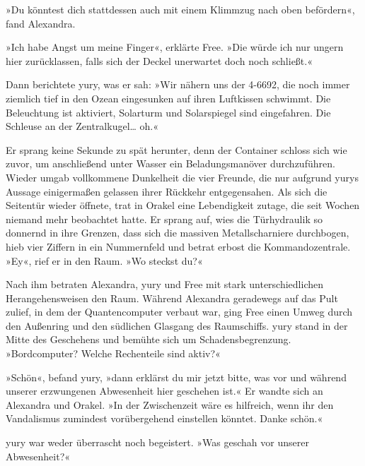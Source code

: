 »Du könntest dich stattdessen auch mit einem Klimmzug nach oben befördern«, fand Alexandra.

»Ich habe Angst um meine Finger«, erklärte Free. »Die würde ich nur ungern hier zurücklassen, falls sich der Deckel unerwartet doch noch schließt.«

Dann berichtete yury, was er sah: »Wir nähern uns der 4-6692, die noch immer ziemlich tief in den Ozean eingesunken auf ihren Luftkissen schwimmt. Die Beleuchtung ist aktiviert, Solarturm und Solarspiegel sind eingefahren. Die Schleuse an der Zentralkugel… oh.«

Er sprang keine Sekunde zu spät herunter, denn der Container schloss sich wie zuvor, um anschließend unter Wasser ein Beladungsmanöver durchzuführen. Wieder umgab vollkommene Dunkelheit die vier Freunde, die nur aufgrund yurys Aussage einigermaßen gelassen ihrer Rückkehr entgegensahen. Als sich die Seitentür wieder öffnete, trat in Orakel eine Lebendigkeit zutage, die seit Wochen niemand mehr beobachtet hatte. Er sprang auf, wies die Türhydraulik so donnernd in ihre Grenzen, dass sich die massiven Metallscharniere durchbogen, hieb vier Ziffern in ein Nummernfeld und betrat erbost die Kommandozentrale. »Ey«, rief er in den Raum. »Wo steckst du?«

Nach ihm betraten Alexandra, yury und Free mit stark unterschiedlichen Herangehensweisen den Raum. Während Alexandra geradewegs auf das Pult zulief, in dem der Quantencomputer verbaut war, ging Free einen Umweg durch den Außenring und den südlichen Glasgang des Raumschiffs. yury stand in der Mitte des Geschehens und bemühte sich um Schadensbegrenzung. »Bordcomputer? Welche Rechenteile sind aktiv?«


»Schön«, befand yury, »dann erklärst du mir jetzt bitte, was vor und während unserer erzwungenen Abwesenheit hier geschehen ist.« Er wandte sich an Alexandra und Orakel. »In der Zwischenzeit wäre es hilfreich, wenn ihr den Vandalismus zumindest vorübergehend einstellen könntet. Danke schön.«


yury war weder überrascht noch begeistert. »Was geschah vor unserer Abwesenheit?«

